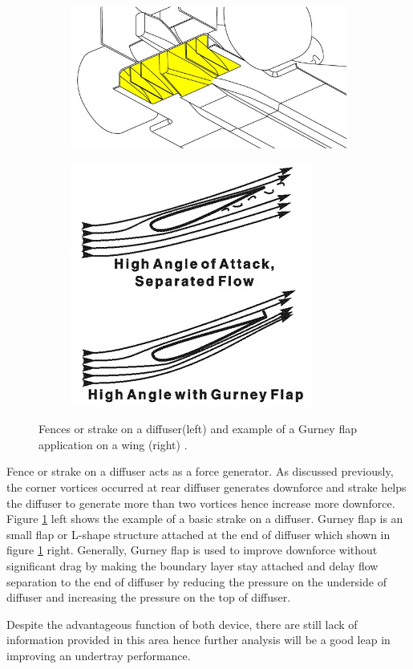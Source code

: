 \begin{figure}[!ht]
\begin{center}
%    
  \begin{subfigure}[b]{0.4\textwidth}
    \includegraphics[scale=0.6]{Figures/diffuser_fences.jpg}
  \end{subfigure}
  \begin{subfigure}[b]{0.4\textwidth}
    \includegraphics[scale=0.8]{Figures/Gurney.jpg}
  \end{subfigure}
%  
  \caption{Fences or strake on a diffuser(left) and example of a Gurney flap application on a wing (right) \cite{Anonymous2020GurneyFlap}.}
    \label{fig:gurney}
\end{center}
\end{figure}

\noindent Fence or strake on a diffuser acts as a force generator. As discussed previously, the corner vortices occurred at rear diffuser generates downforce and strake helps the diffuser to generate more than two vortices hence increase more downforce. Figure \ref{fig:gurney} left shows the example of a basic strake on a diffuser. Gurney flap is an small flap or L-shape structure attached at the end of diffuser which shown in figure \ref{fig:gurney} right. Generally, Gurney flap is used to improve downforce without significant drag \cite{Willemsen2012CFD-basedDiffuser} by making the boundary layer stay attached and delay flow separation to the end of diffuser by reducing the pressure on the underside of diffuser and increasing the pressure on the top of diffuser. 

\noindent Despite the advantageous function of both device, there are still lack of information provided in this area hence further analysis will be a good leap in improving an undertray performance.  
